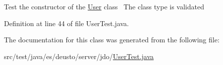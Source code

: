 Test the constructor of the \hyperlink{classes_1_1deusto_1_1server_1_1jdo_1_1_user}{User} class~\newline
The class type is validated~\newline


Definition at line 44 of file User\+Test.\+java.



The documentation for this class was generated from the following file\+:\begin{DoxyCompactItemize}
\item 
src/test/java/es/deusto/server/jdo/\hyperlink{_user_test_8java}{User\+Test.\+java}\end{DoxyCompactItemize}
